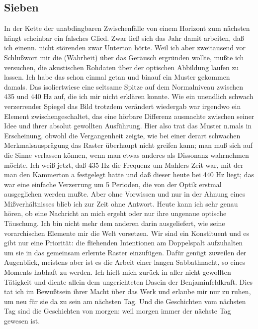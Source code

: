 \documentclass[
]{article}
\author{}
\date{\vspace{-2.5em}}
\begin{document}
\subsection{Sieben}\label{sieben}

In der Kette der unabdingbaren Zwischenfälle von einem Horizont zum
nächsten hängt scheinbar ein falsches Glied. Zwar ließ sich das Jahr
damit arbeiten, daß ich einenn. nicht störenden zwar Unterton hörte.
Weil ich aber zweitausend vor Schlußwort mir die (Wahrheit) über das
Geräusch ergründen wollte, mußte ich versuchen, die akustischen Rohdaten
über der optischen Abbildung laufen zu lassen. Ich habe das schon einmal
getan und binauf ein Muster gekommen damals. Das isoliertwiese eine
seltsame Spitze auf dem Normalniveau zwischen 435 und 440 Hz auf, die
ich mir nicht erklären konnte. Wie ein unendlich schwach verzerrender
Spiegel das Bild trotzdem verändert wiedergab war irgendwo ein Element
zwischengeschaltet, das eine hörbare Differenz ausmachte zwischen seiner
Idee und ihrer absolut gewollten Ausführung. Hier also trat das Muster
n.mals in Erscheinung, obwohl die Vergangenheit zeigte, wie bei einer
derart schwachen Merkmalsausprägung das Raster überhaupt nicht greifen
kann; man muß sich auf die Sinne verlassen können, wenn man etwas
anderes als Dissonanz wahrnehmen möchte. Ich weiß jetzt, daß 435 Hz die
Frequenz um Mahlers Zeit war, mit der man den Kammerton a festgelegt
hatte und daß dieser heute bei 440 Hz liegt; das war eine einfache
Verzerrung um 5 Perioden, die von der Optik erstmal ausgeglichen werden
mußte. Aber ohne Vorwissen und nur in der Ahnung eines Mißverhältnisses
blieb ich zur Zeit ohne Antwort. Heute kann ich sehr genau hören, ob
eine Nachricht an mich ergeht oder nur ihre ungenaue optische Täuschung.
Ich bin nicht mehr dem anderen darin ausgeliefert, wie seine
vorarchischen Elemente mir die Welt vorsetzen. Wir sind ein Konstituent
und es gibt nur eine Priorität: die fliehenden Intentionen am
Doppelspalt aufzuhalten um sie in das gemeinsam erlernte Raster
einzufügen. Dafür genügt zuweilen der Augenblick, meistens aber ist es
die Arbeit einer langen Sabbathnacht, so eines Moments habhaft zu
werden. Ich hielt mich zurück in aller nicht gewollten Tätigkeit und
diente allein dem ungerichteten Dasein der Benjaminfeldkraft. Dies tat
ich im Bewußtsein ihrer Macht über das Werk und erlaube mir nur zu
ruhen, um neu für sie da zu sein am nächsten Tag. Und die Geschichten
vom nächsten Tag sind die Geschichten von morgen: weil morgen immer der
nächste Tag gewesen ist.
\end{document}
